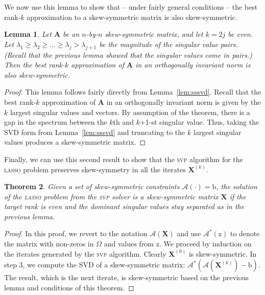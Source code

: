 \documentclass{sig-alternate}
\newtheorem{theorem}{Theorem}
\newtheorem{lemma}[theorem]{Lemma}
\newcommand{\sA}{\mathcal{A}}
\newcommand{\algo}[1]{\textsc{\lowercase{#1}}}
\newcommand{\itn}[1]{^{(#1)}}
\newcommand{\mat}{\boldsymbol}
\renewcommand{\vec}[1]{\boldsymbol{\mathrm{#1}}}
\providecommand{\mA}{\ensuremath{\mat{A}}}
\providecommand{\mX}{\ensuremath{\mat{X}}}
\providecommand{\vb}{\ensuremath{\vec{b}}}
\providecommand{\vz}{\ensuremath{\vec{z}}}
\begin{document}
We now use this lemma to show that -- under fairly general conditions --
the best rank-$k$ approximation to a skew-symmetric matrix is 
also skew-symmetric.
\begin{lemma} \label{lem:rank-k-sssvd}
Let $\mA$ be an $n$-by-$n$ skew-symmetric matrix, and let $k = 2j$ 
be even.  Let $\lambda_1 \ge \lambda_2 \ge \ldots \ge \lambda_j > \lambda_{j+1}$
be the magnitude of the singular value pairs.  (Recall that the
previous lemma showed that the singular values come in pairs.) Then the 
best rank-$k$ approximation of $\mA$ in an orthogonally invariant norm
is also skew-symmetric.
\end{lemma}
\begin{proof}
This lemma follows fairly directly from Lemma~\ref{lem:sssvd}.  Recall
that the best rank-$k$ approximation of $\mA$ in an orthogonally invariant
norm is given by the $k$ largest singular values and vectors.  By assumption
of the theorem, there is a gap in the spectrum between the $k$th and $k$+1-st
singular value.  Thus, taking the SVD form from Lemma~\ref{lem:sssvd}
and truncating to the $k$ largest singular values produces a skew-symmetric
matrix.  
\end{proof}

Finally, we can use this second result to show that the \algo{svp} algorithm
for the \algo{lasso} problem preserves skew-symmetry in all the 
iterates $\mX\itn{k}$.

\begin{theorem} \label{thm:sssvp}
 Given a set of skew-symmetric constraints $\sA(\cdot) = \vb$, the
 solution of the \algo{lasso} problem from the \algo{svp} solver is a skew-symmetric
 matrix $\mX$ if the target rank is even and the dominant singular
 values stay separated as in the previous lemma.
\end{theorem}
\begin{proof}
 In this proof, we revert to the notation $\sA(\mX)$ and use $\sA^*(\vz)$
 to denote the matrix with non-zeros in $\Omega$ and values from $\vz$.
 We proceed by induction on the iterates generated by the \algo{svp} algorithm.
 Clearly $\mX\itn{0}$ is skew-symmetric.  In step 3, we compute
 the SVD of a skew-symmetric matrix: $\sA^*(\sA(\mX\itn{k}) - \vb)$.
 The result, which is the next iterate, is skew-symmetric 
 based on the previous lemma and conditions of this theorem.  
\end{proof}
\end{document}
